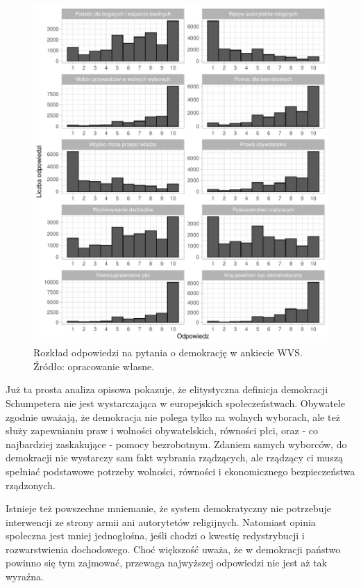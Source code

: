 \documentclass[12pt]{article}
\begin{document}
\begin{figure}

\includegraphics{text_ASA_files/figure-latex/descr-plot-1} \hfill{}

\caption{Rozkład odpowiedzi na pytania o demokrację w ankiecie WVS. Źródło: opracowanie własne.}\label{fig:descr-plot}
\end{figure}

Już ta prosta analiza opisowa pokazuje, że elitystyczna definicja demokracji Schumpetera nie jest wystarczająca w europejskich społeczeństwach. Obywatele zgodnie uważają, że demokracja nie polega tylko na wolnych wyborach, ale też służy zapewnianiu praw i wolności obywatelskich, równości płci, oraz - co najbardziej zaskakujące - pomocy bezrobotnym. Zdaniem samych wyborców, do demokracji nie wystarczy sam fakt wybrania rządzących, ale rządzący ci muszą spełniać podstawowe potrzeby wolności, równości i ekonomicznego bezpieczeństwa rządzonych.

Istnieje też powszechne mniemanie, że system demokratyczny nie potrzebuje interwencji ze strony armii ani autorytetów religijnych. Natomiast opinia społeczna jest mniej jednogłośna, jeśli chodzi o kwestię redystrybucji i rozwarstwienia dochodowego. Choć większość uważa, że w demokracji państwo powinno się tym zajmować, przewaga najwyższej odpowiedzi nie jest aż tak wyraźna.
\end{document}
